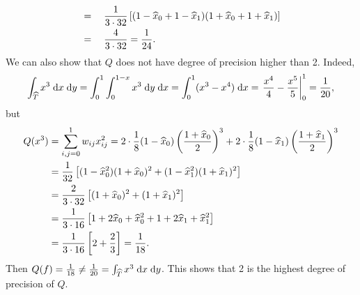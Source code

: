 \documentclass{homework}
\begin{document}
\begin{alphaparts}
\begin{alignat*}{2}
			&{}={}&& \frac{1}{3\cdot 32}\left[(1-\widehat{x}_0 + 1-\widehat{x}_1)(1+\widehat{x}_0+1+\widehat{x}_1)\right] \\
			&{}={}&& \frac{4}{3\cdot 32} = \frac{1}{24}.
		\end{alignat*}
		We can also show that $Q$ does not have degree of precision higher than 2. Indeed,
		\begin{equation*}
			\int_{\widehat{T}}x^3\;\text{d} x\;\text{d} y = \int_{0}^1\int_0^{1-x}x^3\;\text{d} y\;\text{d} x = \int_0^1(x^3-x^4)\;\text{d} x = \left.\frac{x^4}{4} - \frac{x^5}{5}\right|_0^1 = \frac{1}{20},
		\end{equation*}
		but
		\begin{align*}
			Q(x^3) &= \sum_{i,j=0}^1w_{ij}x_{ij}^2 = 2\cdot\frac{1}{8}(1-\widehat{x}_0)\left(\frac{1+\widehat{x}_0}{2}\right)^3 + 2\cdot\frac{1}{8}(1-\widehat{x}_1)\left(\frac{1+\widehat{x}_1}{2}\right)^3 \\ 
			&= \frac{1}{32}\left[(1-\widehat{x}_0^2)(1+\widehat{x}_0)^2 + (1-\widehat{x}_1^2)(1+\widehat{x}_1)^2\right] \\
			&= \frac{2}{3\cdot32}\left[(1+\widehat{x}_0)^2 +(1+\widehat{x}_1)^2\right] \\
			&= \frac{1}{3\cdot 16}\left[1+2\widehat{x}_0+\widehat{x}_0^2 + 1+2\widehat{x}_1+\widehat{x}_1^2\right] \\
			&= \frac{1}{3\cdot 16}\left[2 + \frac{2}{3}\right] = \frac{1}{18}.
		\end{align*}
		Then $Q(f) = \frac{1}{18} \ne \frac{1}{20} = \int_{\widehat{T}} x^3 \;\text{d} x \;\text{d} y$. This shows that 2 is the highest degree of precision of $Q$.
		

\end{alphaparts}
\end{document}
